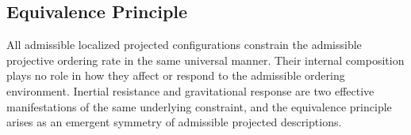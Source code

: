 \subsection{Equivalence Principle}
  \label{subsec:equivalence-principle}

  All admissible localized projected configurations constrain the admissible
  projective ordering rate in the same universal manner.
  Their internal composition plays no role in how they affect or respond to
  the admissible ordering environment.
  Inertial resistance and gravitational response are two effective
  manifestations of the same underlying constraint, and the equivalence
  principle arises as an emergent symmetry of admissible projected
  descriptions.
